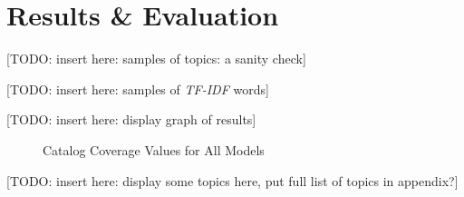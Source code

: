 \chapter{Results \& Evaluation} \label{chp:results}

[TODO: insert here: samples of topics: a sanity check]

[TODO: insert here: samples of \emph{TF-IDF} words]

[TODO: insert here: display graph of results]

\begin{figure}[hhhhhtb]
	\centering
		\caption[Catalog Coverage Values for All Models]{
			Catalog Coverage Values for All Models
		}
	\label{fig:catalog_coverage_0_100}
\end{figure}

[TODO: insert here: display some topics here, put full list of topics in appendix?]
